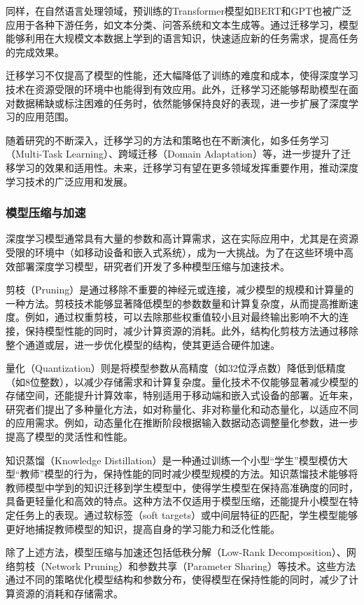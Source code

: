 同样，在自然语言处理领域，预训练的Transformer模型如BERT和GPT也被广泛应用于各种下游任务，如文本分类、问答系统和文本生成等。通过迁移学习，模型能够利用在大规模文本数据上学到的语言知识，快速适应新的任务需求，提高任务的完成效果。

迁移学习不仅提高了模型的性能，还大幅降低了训练的难度和成本，使得深度学习技术在资源受限的环境中也能得到有效应用。此外，迁移学习还能够帮助模型在面对数据稀缺或标注困难的任务时，依然能够保持良好的表现，进一步扩展了深度学习的应用范围。

随着研究的不断深入，迁移学习的方法和策略也在不断演化，如多任务学习（Multi-Task Learning）、跨域迁移（Domain Adaptation）等，进一步提升了迁移学习的效果和适用性。未来，迁移学习有望在更多领域发挥重要作用，推动深度学习技术的广泛应用和发展。

\subsubsection{模型压缩与加速}

深度学习模型通常具有大量的参数和高计算需求，这在实际应用中，尤其是在资源受限的环境中（如移动设备和嵌入式系统），成为一大挑战。为了在这些环境中高效部署深度学习模型，研究者们开发了多种模型压缩与加速技术。

剪枝（Pruning）是通过移除不重要的神经元或连接，减少模型的规模和计算量的一种方法。剪枝技术能够显著降低模型的参数数量和计算复杂度，从而提高推断速度。例如，通过权重剪枝，可以去除那些权重值较小且对最终输出影响不大的连接，保持模型性能的同时，减少计算资源的消耗。此外，结构化剪枝方法通过移除整个通道或层，进一步优化模型的结构，使其更适合硬件加速。

量化（Quantization）则是将模型参数从高精度（如32位浮点数）降低到低精度（如8位整数），以减少存储需求和计算复杂度。量化技术不仅能够显著减少模型的存储空间，还能提升计算效率，特别适用于移动端和嵌入式设备的部署。近年来，研究者们提出了多种量化方法，如对称量化、非对称量化和动态量化，以适应不同的应用需求。例如，动态量化在推断阶段根据输入数据动态调整量化参数，进一步提高了模型的灵活性和性能。

知识蒸馏（Knowledge Distillation）是一种通过训练一个小型“学生”模型模仿大型“教师”模型的行为，保持性能的同时减少模型规模的方法。知识蒸馏技术能够将教师模型中学到的知识迁移到学生模型中，使得学生模型在保持高准确度的同时，具备更轻量化和高效的特点。这种方法不仅适用于模型压缩，还能提升小模型在特定任务上的表现。通过软标签（soft targets）或中间层特征的匹配，学生模型能够更好地捕捉教师模型的知识，提高自身的学习能力和泛化性能。

除了上述方法，模型压缩与加速还包括低秩分解（Low-Rank Decomposition）、网络剪枝（Network Pruning）和参数共享（Parameter Sharing）等技术。这些方法通过不同的策略优化模型结构和参数分布，使得模型在保持性能的同时，减少了计算资源的消耗和存储需求。

